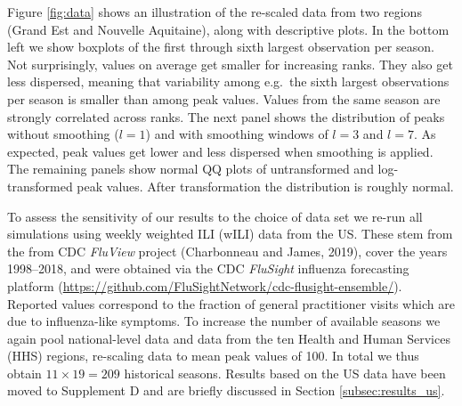 \documentclass[12pt]{article}
\begin{document}
Figure \ref{fig:data} shows an illustration of the re-scaled data from two regions (Grand Est and Nouvelle Aquitaine), along with descriptive plots. In the bottom left we show boxplots of the first through sixth largest observation per season. Not surprisingly, values on average get smaller for increasing ranks. They also get less dispersed, meaning that variability among e.g.\ the sixth largest observations per season is smaller than among peak values. Values from the same season are strongly correlated across ranks. The next panel shows the distribution of peaks without smoothing ($l = 1$) and with smoothing windows of $l = 3$ and $l = 7$. As expected, peak values get lower and less dispersed when smoothing is applied. The remaining panels show normal QQ plots of untransformed and log-transformed peak values. After transformation the distribution is roughly normal.

To assess the sensitivity of our results to the choice of data set we re-run all simulations using  weekly weighted ILI (wILI) data from the US. These stem from the from CDC \textit{FluView} project (Charbonneau and James, 2019), cover the years 1998–2018, and were
obtained via the CDC \textit{FluSight} influenza forecasting platform (\url{https://github.com/FluSightNetwork/cdc-flusight-ensemble/}). Reported values correspond to the fraction of general practitioner visits which are due to influenza-like symptoms. To increase the number of available seasons we again pool national-level data and data from the ten Health and Human Services (HHS) regions, re-scaling data to mean peak values of 100. In total we thus obtain $11 \times 19 = 209$ historical seasons. Results based on the US data have been moved to Supplement D and are briefly discussed in Section \ref{subsec:results_us}.
\end{document}
